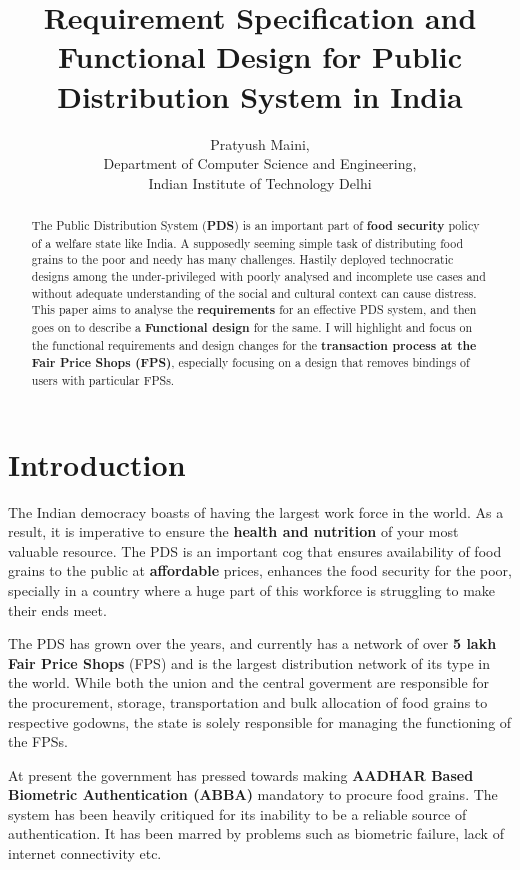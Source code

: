 \documentclass[a4paper,12pt]{extarticle}
\title{Requirement Specification and Functional Design for Public Distribution System in India}
\author{Pratyush Maini, 
\\
Department of Computer Science and Engineering, 
\\
Indian Institute of Technology Delhi}
\begin{document}
\maketitle

\begin{abstract}
The Public Distribution System (\textbf{PDS}) is an important part of \textbf{food security} policy of a welfare state like India. A supposedly seeming simple task of distributing food grains to the poor and needy has many challenges. Hastily deployed technocratic designs among the under-privileged with poorly analysed and incomplete use cases and without adequate understanding of the social and cultural context can cause distress. This paper aims to analyse the \textbf{requirements} for an effective PDS system, and then goes on to describe a\textbf{ Functional design} for the same. I will highlight and focus on the functional requirements and  design changes for the \textbf{transaction process at the Fair Price Shops (FPS)}, especially focusing on a design that removes bindings of users with particular FPSs.
\end{abstract}

\section{Introduction}

The Indian democracy boasts of having the largest work force in the world. As a result, it is imperative to ensure the \textbf{health and nutrition }of your most valuable resource. The PDS is an important cog that ensures availability of food grains to the public at \textbf{affordable} prices, enhances the food security for the poor, specially in a country where a huge part of this workforce is struggling to make their ends meet.

The PDS has grown over the years, and currently has a network of over \textbf{5 lakh Fair Price Shops} (FPS) and is the largest distribution network of its type in the world. While both the union and the central goverment are responsible for the procurement, storage, transportation and bulk allocation of food grains to respective godowns, the state is solely responsible for managing the functioning of the FPSs.

At present the government has pressed towards making \textbf{AADHAR Based Biometric Authentication (ABBA)} mandatory to procure food grains. The system has been heavily critiqued for its inability to be a reliable source of authentication. It has been marred by problems such as biometric failure, lack of internet connectivity etc.
\end{document}
